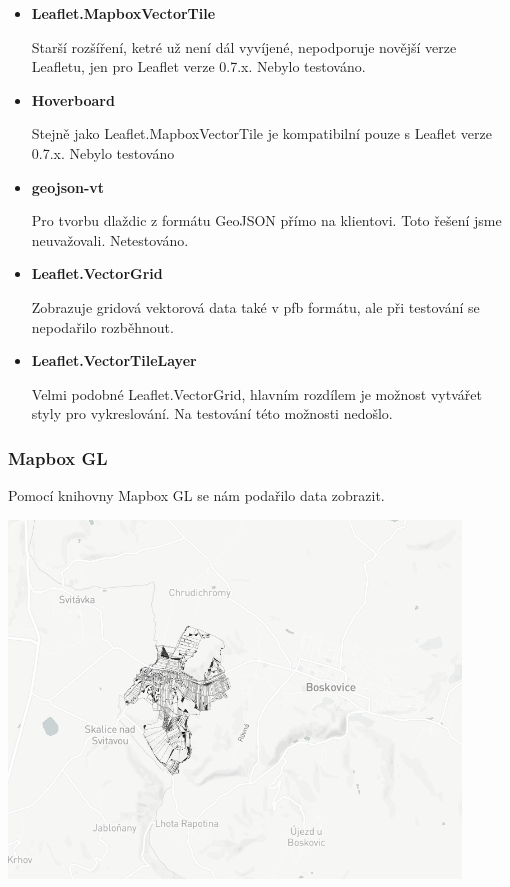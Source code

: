 \documentclass[12pt]{article}
\begin{document}
\begin{itemize}
	\item \textbf{Leaflet.MapboxVectorTile}
	
	Starší rozšíření, ketré už není dál vyvíjené, nepodporuje novější verze Leafletu, jen pro Leaflet verze 0.7.x. Nebylo testováno.
	
	\item \textbf{Hoverboard}
	
	Stejně jako Leaflet.MapboxVectorTile je kompatibilní pouze s Leaflet verze 0.7.x. Nebylo testováno
	
	\item \textbf{geojson-vt}
	
	Pro tvorbu dlaždic z formátu GeoJSON přímo na klientovi. Toto řešení jsme neuvažovali. Netestováno.
	
	\item \textbf{Leaflet.VectorGrid}
	
	Zobrazuje gridová vektorová data také v pfb formátu, ale při testování se nepodařilo rozběhnout.
	
	\item \textbf{Leaflet.VectorTileLayer}
	
	Velmi podobné Leaflet.VectorGrid, hlavním rozdílem je možnost vytvářet styly pro vykreslování. Na testování této možnosti nedošlo.
	
\end{itemize}


\subsubsection{Mapbox GL}
Pomocí knihovny Mapbox GL se nám podařilo data zobrazit.

\begin{center}
	\includegraphics[width=12cm]{./img/mapboxGL_ukazka_dat.png}
\end{center}
\end{document}
